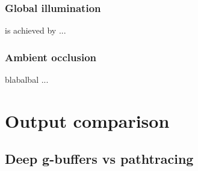 \documentclass{ACGSeminar}
\begin{document}
	\subsubsection{Global illumination} 
		is achieved by ...
	\subsubsection{Ambient occlusion}
		blabalbal ...


\section{Output comparison}
	\subsection{Deep g-buffers vs pathtracing}

\printbibliography
\end{document}
